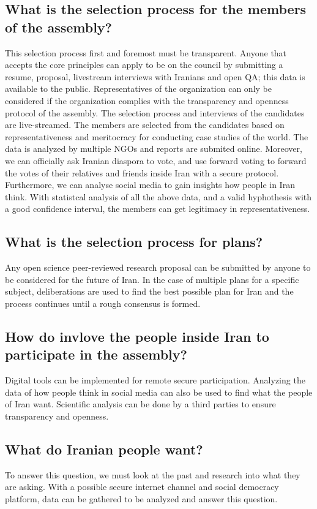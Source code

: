 \documentclass{IEEEtran}
\begin{document}
\subsection{What is the selection process for the members of the assembly?}
This selection process first and foremost must be transparent. Anyone that accepts the core principles can apply to be on the council by submitting a
 resume, proposal, livestream interviews with Iranians and open QA; this data is available to the public. Representatives of the organization can only be considered if the organization complies with the transparency and openness protocol of the assembly. 
 The selection process and interviews of the candidates are live-streamed. The members are selected from the candidates based on representativeness and meritocracy for conducting case studies of the world. 
 The data is analyzed by multiple NGOs and reports are submited online. 
 Moreover, we can officially ask Iranian diaspora to vote, and use forward voting to forward the votes of their relatives and friends inside Iran with a secure protocol.
 Furthermore, we can analyse social media to gain insights how people in Iran think.
 With statistcal analysis of all the above data, and a valid hyphothesis with a good confidence interval, the members can get legitimacy in representativeness.
\subsection{What is the selection process for plans?}
Any open science peer-reviewed research proposal can be submitted by anyone to be considered for the future of Iran. In the case of multiple plans for a specific subject, deliberations are used to find the best possible plan for Iran and the process continues until a rough consensus is formed.

\subsection{How do invlove the people inside Iran to participate in the assembly?}
Digital tools can be implemented for remote secure participation. Analyzing the data of how people think in social media can also be used to find what the people of Iran want. Scientific analysis can be done by a third parties to ensure transparency and openness.



\subsection{What do Iranian people want?}
To answer this question, we must look at the past and research into what they are asking. With a possible secure internet channel and social democracy platform, data can be gathered to be analyzed and answer this question.
\end{document}
